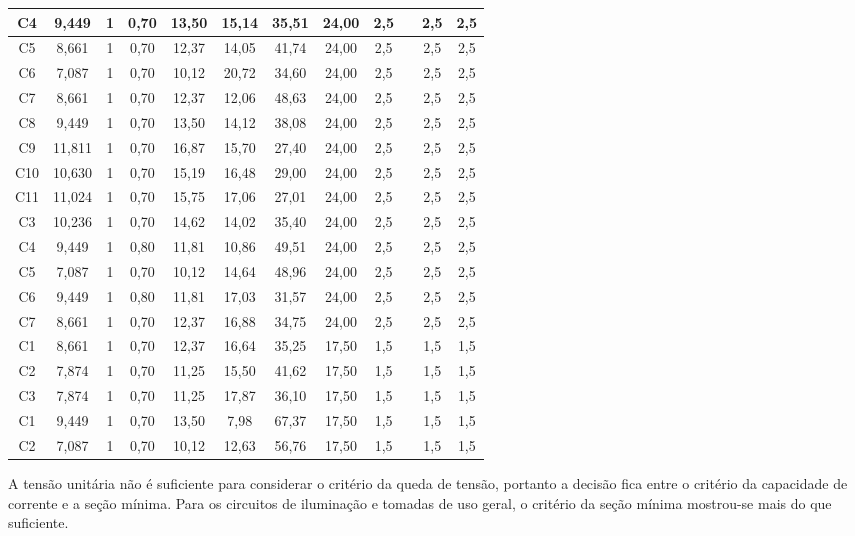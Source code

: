 \begin{table}[H]
{\begin{tabular}{|c|c|c|c|c|c|c|c|c|c|c|c|}
		C4       & 9,449  & 1 & 0,70 & 13,50 & 15,14 & 35,51 & 24,00 & 2,5 &  & 2,5 & 2,5 \\ \hline
		C5       & 8,661  & 1 & 0,70 & 12,37 & 14,05 & 41,74 & 24,00 & 2,5 &  & 2,5 & 2,5 \\ \hline
		C6       & 7,087  & 1 & 0,70 & 10,12 & 20,72 & 34,60 & 24,00 & 2,5 &  & 2,5 & 2,5 \\ \hline
		C7       & 8,661  & 1 & 0,70 & 12,37 & 12,06 & 48,63 & 24,00 & 2,5 &  & 2,5 & 2,5 \\ \hline
		C8       & 9,449  & 1 & 0,70 & 13,50 & 14,12 & 38,08 & 24,00 & 2,5 &  & 2,5 & 2,5 \\ \hline
		C9       & 11,811 & 1 & 0,70 & 16,87 & 15,70 & 27,40 & 24,00 & 2,5 &  & 2,5 & 2,5 \\ \hline
		C10      & 10,630 & 1 & 0,70 & 15,19 & 16,48 & 29,00 & 24,00 & 2,5 &  & 2,5 & 2,5 \\ \hline
		C11      & 11,024 & 1 & 0,70 & 15,75 & 17,06 & 27,01 & 24,00 & 2,5 &  & 2,5 & 2,5 \\ \hline
		C3       & 10,236 & 1 & 0,70 & 14,62 & 14,02 & 35,40 & 24,00 & 2,5 &  & 2,5 & 2,5 \\ \hline
		C4       & 9,449  & 1 & 0,80 & 11,81 & 10,86 & 49,51 & 24,00 & 2,5 &  & 2,5 & 2,5 \\ \hline
		C5       & 7,087  & 1 & 0,70 & 10,12 & 14,64 & 48,96 & 24,00 & 2,5 &  & 2,5 & 2,5 \\ \hline
		C6       & 9,449  & 1 & 0,80 & 11,81 & 17,03 & 31,57 & 24,00 & 2,5 &  & 2,5 & 2,5 \\ \hline
		C7       & 8,661  & 1 & 0,70 & 12,37 & 16,88 & 34,75 & 24,00 & 2,5 &  & 2,5 & 2,5 \\ \hline
		C1       & 8,661  & 1 & 0,70 & 12,37 & 16,64 & 35,25 & 17,50 & 1,5 &  & 1,5 & 1,5 \\ \hline
		C2       & 7,874  & 1 & 0,70 & 11,25 & 15,50 & 41,62 & 17,50 & 1,5 &  & 1,5 & 1,5 \\ \hline
		C3       & 7,874  & 1 & 0,70 & 11,25 & 17,87 & 36,10 & 17,50 & 1,5 &  & 1,5 & 1,5 \\ \hline
		C1       & 9,449  & 1 & 0,70 & 13,50 & 7,98  & 67,37 & 17,50 & 1,5 &  & 1,5 & 1,5 \\ \hline
		C2       & 7,087  & 1 & 0,70 & 10,12 & 12,63 & 56,76 & 17,50 & 1,5 &  & 1,5 & 1,5 \\ \hline
	\end{tabular}}
\end{table}

A tensão unitária não é suficiente para considerar o critério da queda de tensão, portanto a decisão fica entre o critério da capacidade de corrente e a seção mínima. Para os circuitos de iluminação e tomadas de uso geral, o critério da seção mínima mostrou-se mais do que suficiente.

